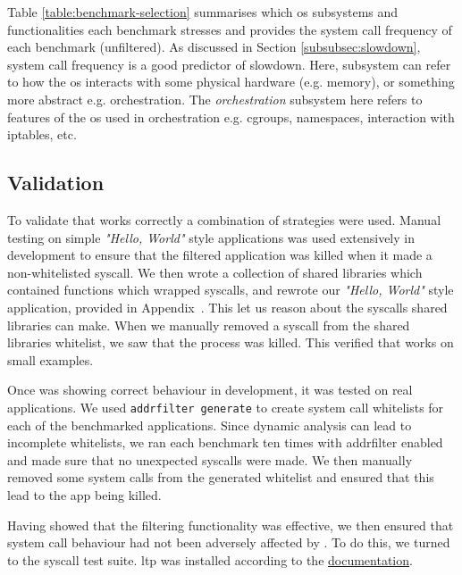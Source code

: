 Table \ref{table:benchmark-selection} summarises which \ac{os}
subsystems and functionalities each benchmark stresses and provides the system call frequency of each
benchmark (unfiltered). As discussed in Section \ref{subsubsec:slowdown}, system
call frequency is a good predictor of slowdown. Here, subsystem can refer to how
the \ac{os} interacts with some physical hardware (e.g. memory), or something
more abstract e.g. orchestration. The \textit{orchestration} subsystem here
refers to features of the \ac{os} used in orchestration e.g. cgroups,
namespaces, interaction with iptables, etc.


\subsection{Validation}

To validate that \af works correctly a combination of strategies were
used. Manual testing on simple \textit{"Hello, World"} style applications was
used extensively in development to ensure that the filtered application was
killed when it made a non-whitelisted syscall. We then wrote a collection of
shared libraries which contained functions which wrapped syscalls, and rewrote
our \textit{"Hello, World"} style application, provided in
Appendix~. This let us reason about the
syscalls shared libraries can make. When we manually removed a syscall from the
shared libraries whitelist, we saw that the process was killed. This verified
that \af works on small examples.

Once \af was showing correct behaviour in development, it was tested on real 
applications. We used \texttt{addrfilter generate} to create system call
whitelists for each of the benchmarked applications.
Since dynamic analysis can lead to incomplete whitelists, we ran each benchmark
ten times with addrfilter enabled and made sure that no unexpected syscalls were
made. We then manually removed some system calls from the generated whitelist and
ensured that this lead to the app being killed.

Having showed that the filtering functionality was effective, we then ensured
that system call behaviour had not been adversely affected by \af. To do this, we
turned to the  syscall test suite. \ac{ltp} was installed according to
the
\href{https://linux-test-project.readthedocs.io/en/latest/users/quick_start.html}{documentation}.

